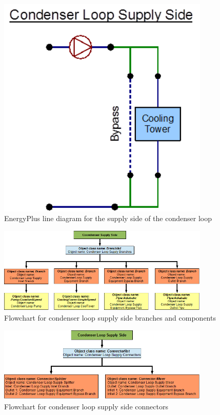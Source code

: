 \begin{figure}[hbtp] %
\centering
\includegraphics[width=0.9\textwidth, height=0.9\textheight, keepaspectratio=true]{media/image064.png}
\caption{EnergyPlus line diagram for the supply side of the condenser loop \protect \label{fig:energyplus-line-diagram-for-the-supply-side-001}}
\end{figure}

\begin{figure}[hbtp] %
\centering
\includegraphics[width=0.9\textwidth, height=0.9\textheight, keepaspectratio=true]{media/image065.png}
\caption{Flowchart for condenser loop supply side branches and components \protect \label{fig:flowchart-for-condenser-loop-supply-side-branches-and}}
\end{figure}

\begin{figure}[hbtp] %
\centering
\includegraphics[width=0.9\textwidth, height=0.9\textheight, keepaspectratio=true]{media/image066.png}
\caption{Flowchart for condenser loop supply side connectors \protect \label{fig:flowchart-for-condenser-loop-supply-side-connectors}}
\end{figure}

